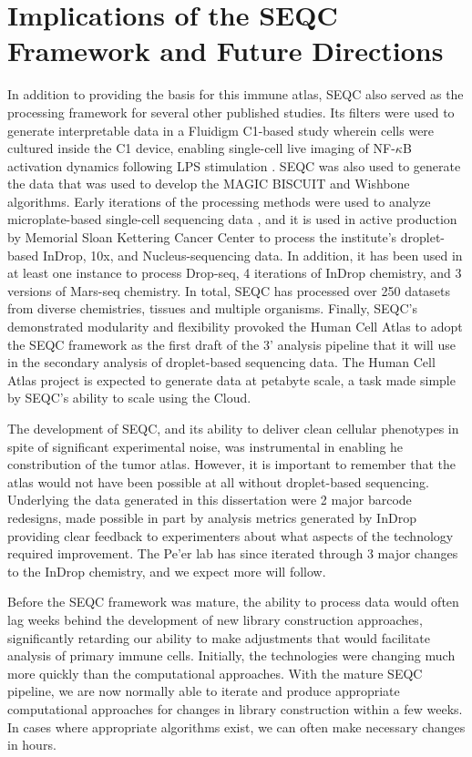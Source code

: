 \section{Implications of the SEQC Framework and Future Directions}
In addition to providing the basis for this immune atlas, SEQC also served as the processing framework for several other published studies. 
Its filters were used to generate interpretable data in a Fluidigm C1-based study wherein cells were cultured inside the C1 device, enabling single-cell live imaging of NF-$\kappa$B activation dynamics following LPS stimulation \citep{Lane2017}. 
SEQC was also used to generate the data that was used to develop the MAGIC \citep{Dijk2017} BISCUIT \citep{Prabhakaran2016,Azizi2017} and Wishbone \citep{Setty2016} algorithms. 
Early iterations of the processing methods were used to analyze microplate-based single-cell sequencing data \citep{Bose2015}, and it is used in active production by Memorial Sloan Kettering Cancer Center to process the institute's droplet-based InDrop, 10x, and Nucleus-sequencing data. 
In addition, it has been used in at least one instance to process Drop-seq, 4 iterations of InDrop chemistry, and 3 versions of Mars-seq chemistry. 
In total, SEQC has processed over 250 datasets from diverse chemistries, tissues and multiple organisms.  
Finally, SEQC's demonstrated modularity and flexibility provoked the Human Cell Atlas \citep{Regev2017} to adopt the SEQC framework as the first draft of the 3' analysis pipeline that it will use in the secondary analysis of droplet-based sequencing data. 
The Human Cell Atlas project is expected to generate data at petabyte scale, a task made simple by SEQC's ability to scale using the Cloud.  

The development of SEQC, and its ability to deliver clean cellular phenotypes in spite of significant experimental noise, was instrumental in enabling he constribution of the tumor atlas. 
However, it is important to remember that the atlas would not have been possible at all without droplet-based sequencing.
Underlying the data generated in this dissertation were 2 major barcode redesigns, made possible in part by analysis metrics generated by InDrop providing clear feedback to experimenters about what aspects of the technology required improvement. 
The Pe'er lab has since iterated through $3$ major changes to the InDrop chemistry, and we expect more will follow.  

Before the SEQC framework was mature, the ability to process data would often lag weeks behind the development of new library construction approaches, significantly retarding our ability to make adjustments that would facilitate analysis of primary immune cells. 
Initially, the technologies were changing much more quickly than the computational approaches. With the mature SEQC pipeline, we are now normally able to iterate and produce appropriate computational approaches for changes in library construction within a few weeks.  
In cases where appropriate algorithms exist, we can often make necessary changes in hours. 

